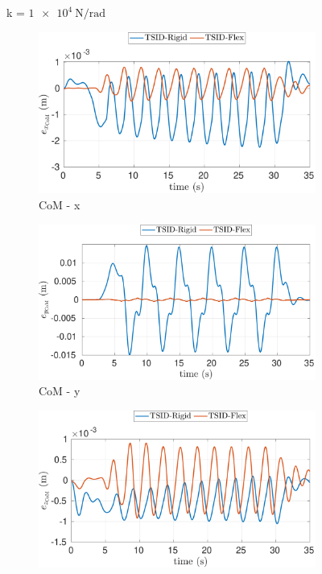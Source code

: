 \begin{figure}[!t]
    \begin{myframe}{k = $\SI{1e4}{\newton \per \radian}$}
    \centering
        \begin{subfigure}[b]{0.49\textwidth}
        \centering
        \includegraphics[width=\columnwidth]{chapter_flexible_joints/figures/comparison_10000_com_error_x.pdf}
        \caption{CoM - x}
    \end{subfigure}
    \hfill
    \begin{subfigure}[b]{0.49\textwidth}
        \centering
        \includegraphics[width=\columnwidth]{chapter_flexible_joints/figures/comparison_10000_com_error_y.pdf}
        \caption{CoM - y}
    \end{subfigure}
     \begin{subfigure}[b]{0.49\textwidth}
        \centering
        \includegraphics[width=\columnwidth]{chapter_flexible_joints/figures/comparison_10000_com_error_z.pdf}

\end{subfigure}
\end{myframe}
\end{figure}
